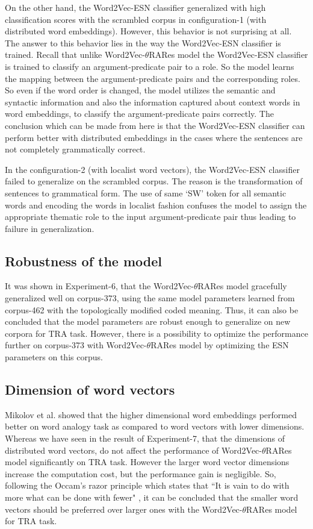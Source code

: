 On the other hand, the Word2Vec-ESN classifier generalized with high classification scores with the scrambled corpus in configuration-1 (with distributed word embeddings). However, this behavior is not surprising at all. The answer to this behavior lies in the way the Word2Vec-ESN classifier is trained. Recall that unlike Word2Vec-$\theta$RARes model the Word2Vec-ESN classifier is trained to classify an argument-predicate pair to a role. So the model learns the mapping between the argument-predicate pairs and the corresponding roles. So even if the word order is changed, the model utilizes the semantic and syntactic information and also the information captured about context words in word embeddings, to classify the argument-predicate pairs correctly. The conclusion which can be made from here is that the Word2Vec-ESN classifier can perform better with distributed embeddings in the cases where the sentences are not completely grammatically correct.

In the configuration-2 (with localist word vectors), the Word2Vec-ESN classifier failed to generalize on the scrambled corpus. The reason is the transformation of sentences to grammatical form. The use of same `SW' token for all semantic words and encoding the words in localist fashion confuses the model to assign the appropriate thematic role to the input argument-predicate pair thus leading to failure in generalization. 

\subsection{Robustness of the model}

It was shown in Experiment-6, that the Word2Vec-$\theta$RARes model gracefully generalized well on corpus-373, using the same model parameters learned from corpus-462 with the topologically modified coded meaning. Thus, it can also be concluded that the model parameters are robust enough to generalize on new corpora for TRA task. However, there is a possibility to optimize the performance further on corpus-373 with Word2Vec-$\theta$RARes model by optimizing the ESN parameters on this corpus.

\subsection{Dimension of word vectors}

Mikolov et al. \cite{w2v:mikolov_2013_efficient,w2v:mikolov_2013_distributed} showed that the higher dimensional word embeddings performed better on word analogy task as compared to word vectors with lower dimensions. Whereas we have seen in the result of Experiment-7, that the dimensions of distributed word vectors,  do not affect the performance of Word2Vec-$\theta$RARes model significantly on TRA task. However the larger word vector dimensions increase the computation cost, but the performance gain is negligible. So, following the Occam's razor principle which states that ``It is vain to do with more what can be done with fewer" \cite{razor:franklin_2002}, it can be concluded that the smaller word vectors should be preferred over larger ones with the Word2Vec-$\theta$RARes model for TRA task.

